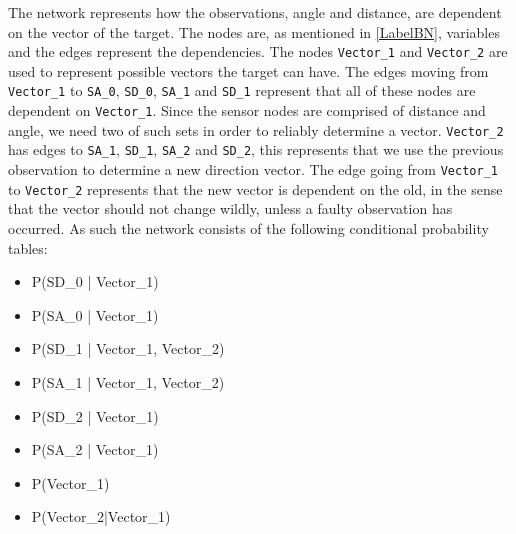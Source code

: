 The network represents how the observations, angle and distance, are dependent
on the vector of the target. The nodes are, as mentioned in \autoref{LabelBN},
variables and the edges represent the dependencies. The nodes
\texttt{Vector\_1} and \texttt{Vector\_2} are used to represent possible
vectors the target can have. The edges moving from \texttt{Vector\_1} to
\texttt{SA\_0}, \texttt{SD\_0}, \texttt{SA\_1} and \texttt{SD\_1} represent
that all of these nodes are dependent on \texttt{Vector\_1}. Since the sensor
nodes are comprised of distance and angle, we need two of such sets in order to
reliably determine a vector. \texttt{Vector\_2} has edges to \texttt{SA\_1},
\texttt{SD\_1}, \texttt{SA\_2} and \texttt{SD\_2}, this represents that we
use the previous observation to determine a new direction vector. The edge
going from \texttt{Vector\_1} to \texttt{Vector\_2} represents that the new
vector is dependent on the old, in the sense that the vector should not change wildly,
unless a faulty observation has occurred. As such the network consists of the
following conditional probability tables:
\begin{itemize}
  \item P(SD\_0 | Vector\_1)
  \item P(SA\_0 | Vector\_1)
  \item P(SD\_1 | Vector\_1, Vector\_2)
  \item P(SA\_1 | Vector\_1, Vector\_2)
  \item P(SD\_2 | Vector\_1)
  \item P(SA\_2 | Vector\_1)
  \item P(Vector\_1)
  \item P(Vector\_2|Vector\_1)
\end{itemize} 
